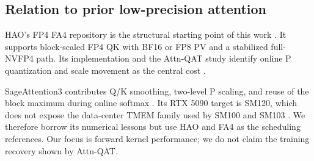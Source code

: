 \subsection{Relation to prior low-precision attention}

HAO's FP4 FA4 repository is the structural starting point of this work
\cite{hao2026fp4flashattention}. It supports block-scaled FP4 QK with BF16 or
FP8 PV and a stabilized full-NVFP4 path. Its implementation and the Attn-QAT
study identify online P quantization and scale movement as the central cost
\cite{zhang2026attnqat}.

SageAttention3 contributes Q/K smoothing, two-level P scaling, and reuse of
the block maximum during online softmax \cite{zhang2025sageattention3}. Its
RTX 5090 target is SM120, which does not expose the data-center \tcgen{} TMEM
family used by SM100 and SM103 \cite{nvidia2026ptx}. We therefore borrow its
numerical lessons but use HAO and FA4 as the scheduling references. Our focus
is forward kernel performance; we do not claim the training recovery shown by
Attn-QAT.
